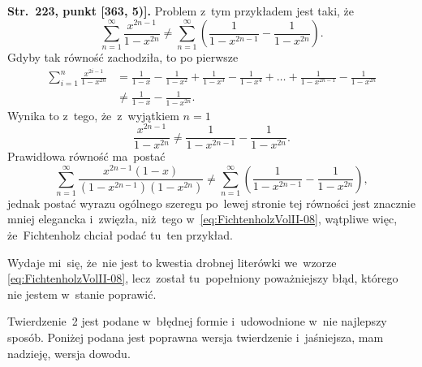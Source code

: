 \documentclass[a4paper,11pt]{article}
\begin{document}
\start \textbf{Str.~223, punkt [363, 5)].} Problem z~tym przykładem
jest taki, że
\begin{equation}
  \label{eq:FichtenholzVolII-08}
  \sum_{ n = 1 }^{ \infty } \frac{ x^{ 2n - 1 } }{ 1 - x^{ 2n } }
  \neq \sum_{ n = 1 }^{ \infty } \left( \frac{ 1 }{ 1 - x^{ 2n - 1 } }
    - \frac{ 1 }{ 1 - x^{ 2n } } \right).
\end{equation}
Gdyby tak równość zachodziła, to po pierwsze
\begin{equation}
  \label{eq:FichtenholzVolII-09}
  \begin{split}
    \sum_{ i = 1 }^{ n } \frac{ x^{ 2i - 1 } }{ 1 - x^{ 2n } }
    &=
      \frac{ 1 }{ 1 - x } - \frac{ 1 }{ 1 - x^{ 2 } }
      + \frac{ 1 }{ 1 - x^{ 3 } } - \frac{ 1 }{ 1 - x^{ 4 } }
      + \ldots + \frac{ 1 }{ 1 - x^{ 2n - 1 } } - \frac{ 1 }{ 1 - x^{ 2n } } \\
    &\neq \frac{ 1 }{ 1 - x } - \frac{ 1 }{ 1 - x^{ 2n } }.
  \end{split}
\end{equation}
Wynika to z~tego, że~z~wyjątkiem $n = 1$
\begin{equation}
  \label{eq:FichtenholzVolII-10}
  \frac{ x^{ 2n - 1 } }{ 1 - x^{ 2n } } \neq
  \frac{ 1 }{ 1 - x^{ 2n - 1 } } - \frac{ 1 }{ 1 - x^{ 2n } }.
\end{equation}
Prawidłowa równość ma~postać
\begin{equation}
  \label{eq:FichtenholzVolII-11}
  \sum_{ n = 1 }^{ \infty } \frac{ x^{ 2n - 1 } ( 1 - x ) }{ ( 1 - x^{ 2n - 1 } )
    ( 1 - x^{ 2n } ) }
  \neq
  \sum_{ n = 1 }^{ \infty } \left( \frac{ 1 }{ 1 - x^{ 2n - 1 } }
    - \frac{ 1 }{ 1 - x^{ 2n } } \right),
\end{equation}
jednak postać wyrazu ogólnego szeregu po~lewej stronie tej równości
jest znacznie mniej elegancka i~zwięzła, niż~tego
w~\eqref{eq:FichtenholzVolII-08}, wątpliwe więc, że~Fichtenholz chciał
podać tu~ten przykład.

Wydaje mi~się, że~nie jest to kwestia drobnej literówki we~wzorze
\eqref{eq:FichtenholzVolII-08}, lecz~został tu~popełniony poważniejszy
błąd, którego nie jestem w~stanie poprawić.

\vspace{\spaceFour}



\start {} Twierdzenie~2 jest podane w~błędnej formie
i~udowodnione w~nie najlepszy sposób. Poniżej podana jest poprawna
wersja twierdzenie i~jaśniejsza, mam nadzieję, wersja dowodu.
\end{document}
